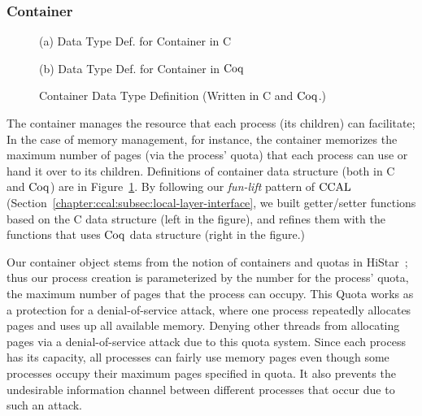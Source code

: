\subsubsection{Container} 
\begin{figure}
\begin{minipage}[t]{.45\textwidth}
\raggedright
 
\begin{center}
(a) Data Type Def. for Container in C
\end{center}
\end{minipage}
\hfill
\noindent
\begin{minipage}[t]{.45\textwidth}
\raggedleft
 
\begin{center}
(b) Data Type Def. for Container in $\mathrm{Coq}$
\end{center}
\end{minipage}
\caption{Container Data Type Definition (Written in C and $\mathrm{Coq}$.)}
\label{fig:chapter:certikos:container}
\end{figure}
The container manages the resource that each process (its children) can facilitate; 
In the case of memory management, for instance,
the container memorizes the maximum number of pages (via the process' quota) 
that each process can use or hand it over to its children.
Definitions of container data structure (both in C and $\mathrm{Coq}$) are in 
Figure~\ref{fig:chapter:certikos:container}. 
By following our \textit{fun-lift} pattern of $\mathrm{CCAL}$ (Section~\ref{chapter:ccal:subsec:local-layer-interface}, 
we built getter/setter functions based on the C data structure (left in the figure), 
and refines them with the functions that uses $\mathrm{Coq}$ data structure (right in the figure.)

Our container object stems from the notion of containers and quotas in HiStar~\cite{zeldovich06};
thus our process creation is parameterized by the number for the process' quota, the maximum number of pages that 
the process can occupy.
This Quota works as a protection for a denial-of-service attack, where one process repeatedly allocates pages and uses up all available memory. 
Denying other threads from allocating pages via a denial-of-service attack due to this quota system. 
Since each process has its capacity, all processes can fairly use memory pages even though some processes occupy their maximum pages specified in quota. 
It also prevents the undesirable information channel between different processes that occur due to such an attack.


